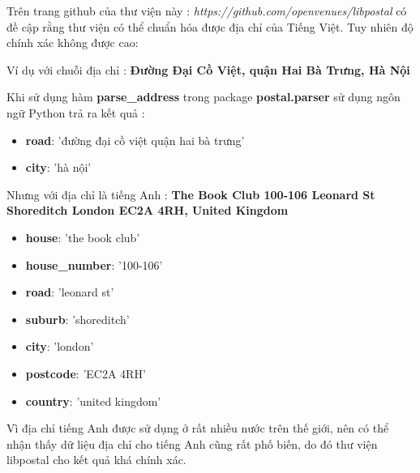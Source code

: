 Trên trang github của thư viện này : \textit{https://github.com/openvenues/libpostal} có đề cập rằng thư viện có thể chuẩn hóa được địa chỉ của Tiếng Việt. Tuy nhiên độ chính xác không được cao:
  \vspace*{0.5cm}

Ví dụ với chuỗi địa chỉ : \textbf{Đường Đại Cồ Việt, quận Hai Bà Trưng, Hà Nội}
  \vspace*{0.5cm}

Khi sử dụng hàm \textbf{ parse\_address } trong package \textbf{ postal.parser } sử dụng ngôn ngữ Python trả ra kết quả :
\begin{itemize}
    \item  \textbf{road}: 'đường đại cồ việt quận hai bà trưng'
    \item  \textbf{city}: 'hà nội'
\end{itemize}
Nhưng với địa chỉ là tiếng Anh : \textbf{The Book Club 100-106 Leonard St Shoreditch London EC2A 4RH, United Kingdom}

\begin{itemize}
    \item  \textbf{house}: 'the book club'
    \item  \textbf{house\_number}: '100-106'
    \item  \textbf{road}: 'leonard st'
    \item  \textbf{suburb}: 'shoreditch'
    \item  \textbf{city}: 'london'
    \item  \textbf{postcode}: 'EC2A 4RH'
    \item  \textbf{country}: 'united kingdom'
\end{itemize}

Vì địa chỉ tiếng Anh được sử dụng ở rất nhiều nước trên thế giới, nên có thể nhận thấy dữ liệu địa chỉ cho tiếng Anh cũng rất phố biến, do đó thư viện libpostal cho kết quả khá chính xác.
